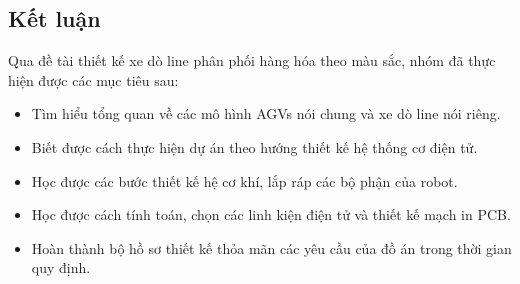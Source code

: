           \subsection{Kết luận}
               \hspace*{0.6cm}Qua đề tài thiết kế xe dò line phân phối hàng hóa theo màu sắc, nhóm đã thực hiện được các mục tiêu sau:
               \begin{itemize}
                    \item Tìm hiểu tổng quan về các mô hình AGVs nói chung và xe dò line nói riêng.
                    \item Biết được cách thực hiện dự án theo hướng thiết kế hệ thống cơ điện tử.
                    \item Học được các bước thiết kế hệ cơ khí, lắp ráp các bộ phận của robot.
                    \item Học được cách tính toán, chọn các linh kiện điện tử và thiết kế mạch in PCB.
                    \item Hoàn thành bộ hồ sơ thiết kế thỏa mãn các yêu cầu của đồ án trong thời gian quy định.
               \end{itemize}